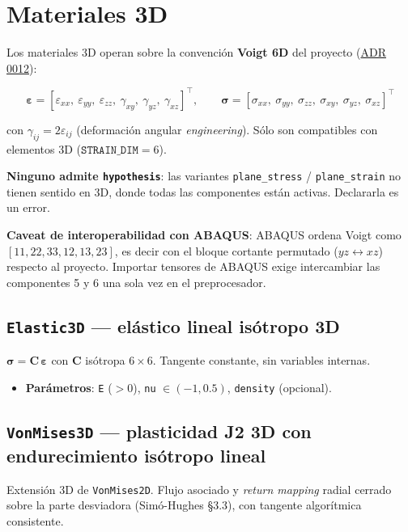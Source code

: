 \documentclass[11pt,oneside]{report}
\begin{document}
\section{Materiales 3D}

Los materiales 3D operan sobre la convención \textbf{Voigt 6D} del proyecto (\href{https://github.com/jretamav/solidum-fem/blob/main/docs/adr/0012-solidos-3d-y-voigt-6d.md}{ADR 0012}):

\[
\boldsymbol\varepsilon = [\varepsilon_{xx},\ \varepsilon_{yy},\ \varepsilon_{zz},\ \gamma_{xy},\ \gamma_{yz},\ \gamma_{xz}]^\top, \qquad \boldsymbol\sigma = [\sigma_{xx},\ \sigma_{yy},\ \sigma_{zz},\ \sigma_{xy},\ \sigma_{yz},\ \sigma_{xz}]^\top
\]

con $\gamma_{ij} = 2\varepsilon_{ij}$ (deformación angular \textit{engineering}). Sólo son compatibles con elementos 3D ($\texttt{STRAIN\_DIM} = 6$).

\textbf{Ninguno admite \texttt{hypothesis}}: las variantes \texttt{plane\_stress} / \texttt{plane\_strain} no tienen sentido en 3D, donde todas las componentes están activas. Declararla es un error.

\textbf{Caveat de interoperabilidad con ABAQUS}: ABAQUS ordena Voigt como $[11, 22, 33, 12, 13, 23]$, es decir con el bloque cortante permutado ($yz \leftrightarrow xz$) respecto al proyecto. Importar tensores de ABAQUS exige intercambiar las componentes 5 y 6 una sola vez en el preprocesador.

\subsection{\texttt{Elastic3D} --- elástico lineal isótropo 3D}

$\boldsymbol\sigma = \mathbf{C}\,\boldsymbol\varepsilon$ con $\mathbf{C}$ isótropa $6\times6$. Tangente constante, sin variables internas.

\begin{itemize}
  \item \textbf{Parámetros}: \texttt{E} ($>0$), \texttt{nu} $\in (-1, 0.5)$, \texttt{density} (opcional).
\end{itemize}

\subsection{\texttt{VonMises3D} --- plasticidad J2 3D con endurecimiento isótropo lineal}

Extensión 3D de \texttt{VonMises2D}. Flujo asociado y \textit{return mapping} radial cerrado sobre la parte desviadora (Simó-Hughes §3.3), con tangente algorítmica consistente.
\end{document}
